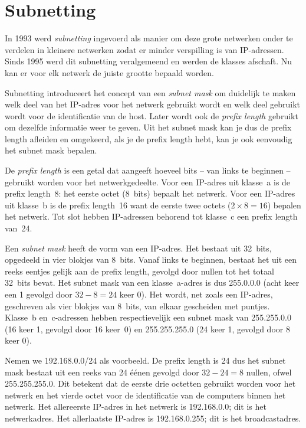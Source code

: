 \section{Subnetting}
\label{sec:subnetting}

In 1993 werd \emph{subnetting} ingevoerd als manier om deze grote netwerken onder te verdelen in kleinere netwerken zodat er minder verspilling is van IP-adressen.
Sinds 1995 werd dit subnetting veralgemeend en werden de klasses afschaft.
Nu kan er voor elk netwerk de juiste grootte bepaald worden.

Subnetting introduceert het concept van een \emph{subnet mask} om duidelijk te maken welk deel van het IP-adres voor het netwerk gebruikt wordt en welk deel gebruikt wordt voor de identificatie van de host.
Later wordt ook de \emph{prefix length} gebruikt om dezelfde informatie weer te geven.
Uit het subnet mask kan je dus de prefix length afleiden en omgekeerd, als je de prefix length hebt, kan je ook eenvoudig het subnet mask bepalen.

De \emph{prefix length} is een getal dat aangeeft hoeveel bits -- van links te beginnen -- gebruikt worden voor het netwerkgedeelte.
Voor een IP-adres uit klasse~a is de prefix length~8: het eerste octet (8~bits) bepaalt het netwerk.
Voor een IP-adres uit klasse~b is de prefix length~16 want de eerste twee octets ($2\times 8=16$) bepalen het netwerk.
Tot slot hebben IP-adressen behorend tot klasse~c een prefix length van~24.

Een \emph{subnet mask} heeft de vorm van een IP-adres.
Het bestaat uit 32~bits, opgedeeld in vier blokjes van 8~bits.
Vanaf links te beginnen, bestaat het uit een reeks eentjes gelijk aan de prefix length, gevolgd door nullen tot het totaal 32~bits bevat.
Het subnet mask van een klasse~a-adres is dus 255.0.0.0 (acht keer een 1 gevolgd door $32-8=24$ keer 0).
Het wordt, net zoals een IP-adres, geschreven als vier blokjes van 8~bits, van elkaar gescheiden met puntjes.
Klasse~b en~c-adressen hebben respectievelijk een subnet mask van 255.255.0.0 (16 keer 1, gevolgd door 16 keer~0) en 255.255.255.0 (24 keer 1, gevolgd door 8 keer 0).

Nemen we 192.168.0.0/24 als voorbeeld.
De prefix length is 24 dus het subnet mask bestaat uit een reeks van 24 éénen gevolgd door $32-24=8$ nullen, ofwel 255.255.255.0.
Dit betekent dat de eerste drie octetten gebruikt worden voor het netwerk en het vierde octet voor de identificatie van de computers binnen het netwerk.
Het allereerste IP-adres in het netwerk is 192.168.0.0; dit is het netwerkadres.
Het allerlaatste IP-adres is 192.168.0.255; dit is het broadcastadres.

